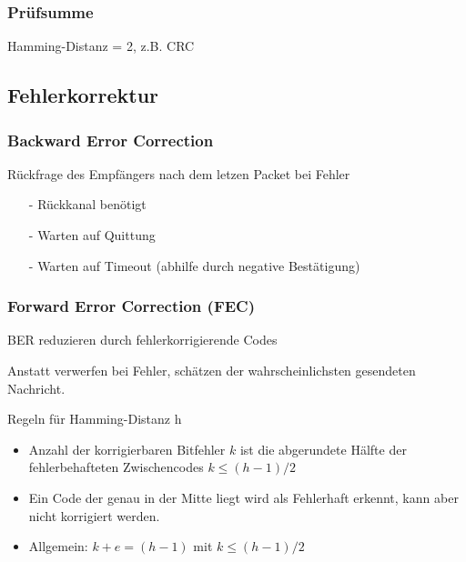 \subsubsection{Prüfsumme}

Hamming-Distanz = 2, z.B. CRC


\subsection{Fehlerkorrektur}

\subsubsection{Backward Error Correction}
Rückfrage des Empfängers nach dem letzen Packet bei Fehler
\begin{itemize}
	\item[-] Rückkanal benötigt
	\item[-] Warten auf Quittung
	\item[-] Warten auf Timeout (abhilfe durch negative Bestätigung)
\end{itemize}

\subsubsection{Forward Error Correction (FEC)}
BER reduzieren durch fehlerkorrigierende Codes

Anstatt verwerfen bei Fehler, schätzen der wahrscheinlichsten gesendeten Nachricht.

Regeln für Hamming-Distanz h
\begin{itemize}
	\item Anzahl der korrigierbaren Bitfehler $k$ ist die abgerundete Hälfte
	      der fehlerbehafteten Zwischencodes $k \le (h-1)/2$
	\item Ein Code der genau in der Mitte liegt wird als Fehlerhaft erkennt,
	      kann aber nicht korrigiert werden.
	\item Allgemein: $k + e = (h-1)$ mit $k \le (h-1)/2$
\end{itemize}


